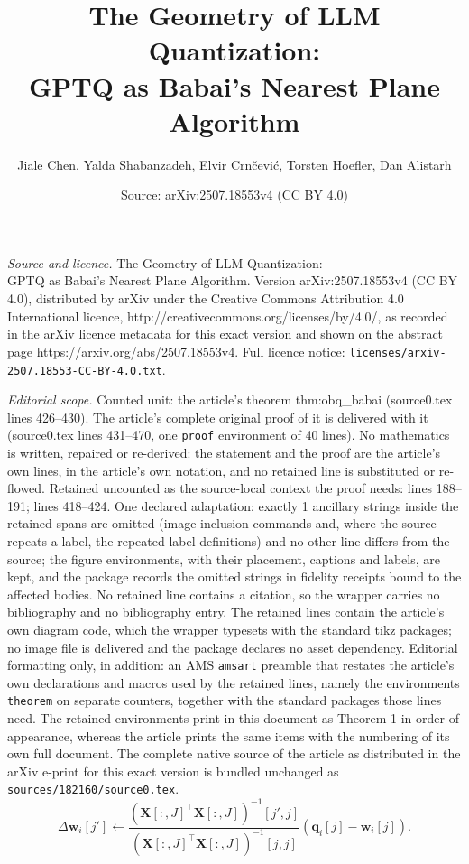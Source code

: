 \documentclass[10pt,a4paper]{amsart}
\title{The Geometry of LLM Quantization: \\ GPTQ as Babai's Nearest Plane Algorithm}
\author{Jiale Chen, Yalda Shabanzadeh, Elvir Crn\v{c}evi\'c, Torsten Hoefler, Dan Alistarh}
\date{Source: arXiv:2507.18553v4 (CC BY 4.0)}
\begin{document}
\maketitle

\noindent\emph{Source and licence.} The Geometry of LLM Quantization: \\ GPTQ as Babai's Nearest Plane Algorithm. Version arXiv:2507.18553v4 (CC BY 4.0), distributed by arXiv under the Creative Commons Attribution 4.0 International licence, http://creativecommons.org/licenses/by/4.0/, as recorded in the arXiv licence metadata for this exact version and shown on the abstract page https://arxiv.org/abs/2507.18553v4. Full licence notice: \texttt{licenses/arxiv-2507.18553-CC-BY-4.0.txt}.\par\smallskip

\noindent\textit{Editorial scope.} Counted unit: the article's theorem thm:obq\_babai (source0.tex lines 426--430). The article's complete original proof of it is delivered with it (source0.tex lines 431--470, one \texttt{proof} environment of 40 lines). No mathematics is written, repaired or re-derived: the statement and the proof are the article's own lines, in the article's own notation, and no retained line is substituted or re-flowed.  Retained uncounted as the source-local context the proof needs: lines 188--191; lines 418--424.  One declared adaptation: exactly 1 ancillary strings inside the retained spans are omitted (image-inclusion commands and, where the source repeats a label, the repeated label definitions) and no other line differs from the source; the figure environments, with their placement, captions and labels, are kept, and the package records the omitted strings in fidelity receipts bound to the affected bodies.  No retained line contains a citation, so the wrapper carries no bibliography and no bibliography entry.  The retained lines contain the article's own diagram code, which the wrapper typesets with the standard tikz packages; no image file is delivered and the package declares no asset dependency.  Editorial formatting only, in addition: an AMS \texttt{amsart} preamble that restates the article's own declarations and macros used by the retained lines, namely the environments \texttt{theorem} on separate counters, together with the standard packages those lines need.  The retained environments print in this document as Theorem 1 in order of appearance, whereas the article prints the same items with the numbering of its own full document.  The complete native source of the article as distributed in the arXiv e-print for this exact version is bundled unchanged as \texttt{sources/182160/source0.tex}.
\begin{equation}
\Delta \bm{w}_{i} [j'] \leftarrow \frac{\left( \bm{X} [:, J]^\top \bm{X} [:, J] \right)^{-1}[j', j]}{\left( \bm{X} [:, J]^\top \bm{X} [:, J] \right)^{-1}[j, j]} \left( \bm{q}_{i} [j] - \bm{w}_{i} [j] \right)
\label{eq:obq_update} .
\end{equation}
\end{document}
